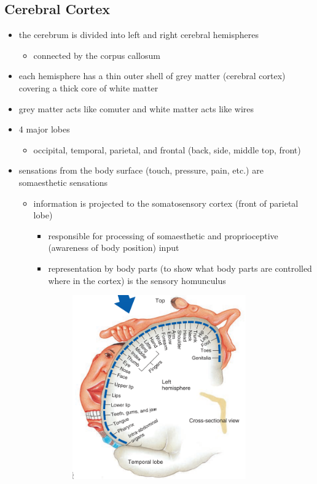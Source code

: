 \documentclass[10pt]{article}
\begin{document}
\subsection{Cerebral Cortex}
\begin{itemize}
    \item the cerebrum is divided into left and right cerebral hemispheres
        \begin{itemize}
            \item connected by the corpus callosum
        \end{itemize}
    \item each hemisphere has a thin outer shell of grey matter (cerebral cortex) covering a thick core of white matter 
    \item grey matter acts like comuter and white matter acts like wires 
    \item 4 major lobes
        \begin{itemize}
            \item occipital, temporal, parietal, and frontal (back, side, middle top, front)
        \end{itemize}
    \item sensations from the body surface (touch, pressure, pain, etc.) are somaesthetic sensations
        \begin{itemize}
            \item information is projected to the somatosensory cortex (front of parietal lobe)
                \begin{itemize}
                    \item responsible for processing of somaesthetic and proprioceptive (awareness of body position) input
                    \item representation by body parts (to show what body parts are controlled where in the cortex) is the sensory homunculus
                        \begin{figure}[h]
                            \centering
                            \includegraphics[width=0.8\textwidth]{sensoryHomunculus}

\end{figure}
\end{itemize}
\end{itemize}
\end{itemize}
\end{document}
